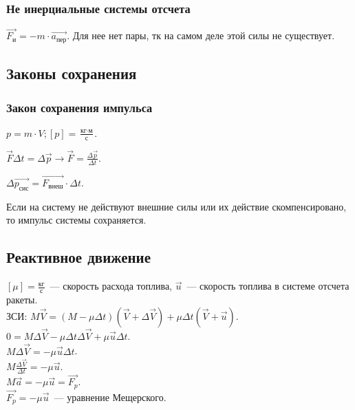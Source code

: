\documentclass[12pt]{article}
\begin{document}
	\subsubsection{Не инерциальные системы отсчета}
	\begin{definition}
		$\vec{F_{\text{и}}} = -m \cdot \vec{a_{\text{пер}}}$. Для нее нет пары, тк на самом деле этой силы не существует.
	\end{definition}
	\subsection{Законы сохранения}
	\subsubsection{Закон сохранения импульса}
	\begin{definition}[Импульс]
		$p = m \cdot V; [p] = \frac{\text{кг} \cdot \text{м}}{\text{с}}$.
	\end{definition}
	\begin{definition}
		$\vec{F} \varDelta t = \varDelta \vec{p} \rightarrow \vec{F} = \frac{\varDelta \vec{p}}{\varDelta t}$.
	\end{definition}
	\begin{definition}
		$\varDelta \vec{p_{\text{сис}}} = \vec{F_{\text{внеш}}} \cdot \varDelta t$.
	\end{definition}
	\begin{definition}
		Если на систему не действуют внешние силы или их действие скомпенсировано, то импульс системы сохраняется.
	\end{definition}
	\subsection{Реактивное движение}
	$[\mu] = \frac{\text{кг}}{\text{с}}$~--- скорость расхода топлива, $\vec{u}$~--- скорость топлива в системе отсчета ракеты.\\
	ЗСИ: $M \vec{V} = (M - \mu \varDelta t)(\vec{V} + \varDelta \vec{V}) + \mu \varDelta t (\vec{V} + \vec{u})$.\\
	$0 = M \varDelta \vec{V} - \mu \varDelta t \varDelta \vec{V} + \mu \vec{u} \varDelta t$.\\
	$M \varDelta \vec{V} = -\mu \vec{u} \varDelta t$.\\
	$M \frac{\varDelta \vec{V}}{\varDelta t} = -\mu \vec{u}$.\\
	$M \vec{a} = - \mu \vec{u} = \vec{F_{p}}$.\\
	$\vec{F_{p}} = -\mu \vec{u}$~--- уравнение Мещерского.
\end{document}
